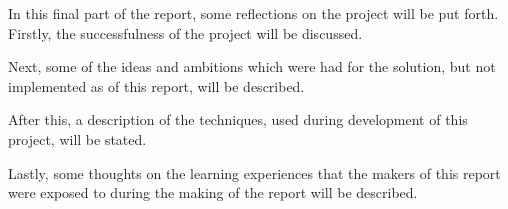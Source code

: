 In this final part of the report, some reflections on the project will be put forth.
Firstly, the successfulness of the project will be discussed.

Next, some of the ideas and ambitions which were had for the solution, but not implemented as of this report, will be described.

After this, a description of the techniques, used during development of this project, will be stated.

Lastly, some thoughts on the learning experiences that the makers of this report were exposed to during the making of the report will be described.
